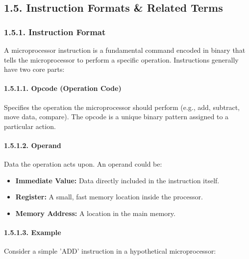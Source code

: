 \documentclass[
]{article}
\begin{document}
\hypertarget{15-instruction-formats--related-terms}{%
\subsection{1.5. Instruction Formats \& Related
Terms}\label{15-instruction-formats--related-terms}}

\hypertarget{151-instruction-format}{%
\subsubsection{1.5.1. Instruction Format}\label{151-instruction-format}}

A microprocessor instruction is a fundamental command encoded in binary
that tells the microprocessor to perform a specific operation.
Instructions generally have two core parts:

\hypertarget{1511-opcode-operation-code}{%
\paragraph{1.5.1.1. Opcode (Operation
Code)}\label{1511-opcode-operation-code}}

Specifies the operation the microprocessor should perform (e.g., add,
subtract, move data, compare). The opcode is a unique binary pattern
assigned to a particular action.

\hypertarget{1512-operand}{%
\paragraph{1.5.1.2. Operand}\label{1512-operand}}

Data the operation acts upon. An operand could be:

\begin{itemize}
\item
  \textbf{Immediate Value:} Data directly included in the instruction
  itself.
\item
  \textbf{Register:} A small, fast memory location inside the processor.
\item
  \textbf{Memory Address:} A location in the main memory.
\end{itemize}

\hypertarget{1513-example}{%
\paragraph{1.5.1.3. Example}\label{1513-example}}

Consider a simple 'ADD' instruction in a hypothetical microprocessor:
\end{document}
